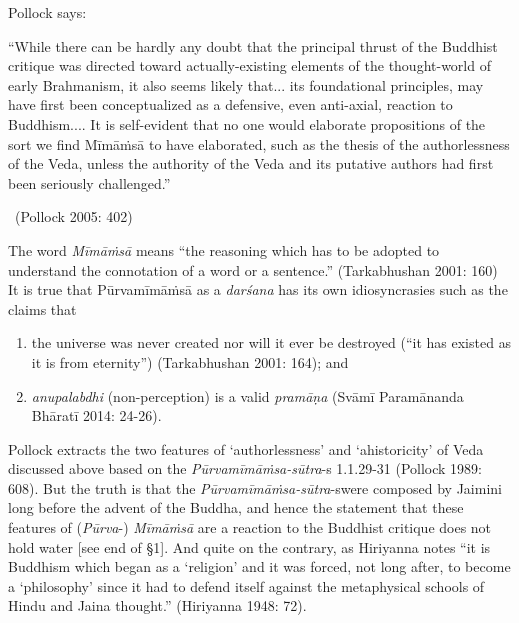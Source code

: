 Pollock says:

\begin{myquote}
“While there can be hardly any doubt that the principal thrust of the Buddhist critique was directed toward actually-existing elements of the thought-world of early Brahmanism, it also seems likely that... its foundational principles, may have first been conceptualized as a defensive, even anti-axial, reaction to Buddhism.... It is self-evident that no one would elaborate propositions of the sort we find Mīmāṁsā to have elaborated, such as the thesis of the authorlessness of the Veda, unless the authority of the Veda and its putative authors had first been seriously challenged.” 

~\hfill (Pollock 2005: 402)
\end{myquote}

The word \textit{Mīmāṁsā} means “the reasoning which has to be adopted to understand the connotation of a word or a sentence.” (Tarkabhushan 2001: 160) It is true that Pūrvamīmāṁsā as a \textit{darśana} has its own idiosyncrasies such as the claims that

\begin{enumerate}
\itemsep=0pt
\item the universe was never created nor will it ever be destroyed (“it has existed as it is from eternity”) (Tarkabhushan 2001: 164); and

 \item \textit{anupalabdhi} (non-perception) is a valid \textit{pramāṇa} (Svāmī Paramānanda Bhāratī 2014: 24-26).

\end{enumerate}

Pollock extracts the two features of ‘authorlessness’ and ‘ahistoricity’ of Veda discussed above based on the \textit{Pūrvamīmāṁsa-sūtra}-s 1.1.29-31 (Pollock 1989: 608). But the truth is that the \textit{Pūrvamīmāṁsa-sūtra}-s\break were composed by Jaimini long before the advent of the Buddha, and hence the statement that these features of (\textit{Pūrva}-) \textit{Mīmāṁsā }are a reaction to the Buddhist critique does not hold water [see end of §1]. And quite on the contrary, as Hiriyanna notes “it is Buddhism which began as a ‘religion’ and it was forced, not long after, to become a ‘philosophy’ since it had to defend itself against the metaphysical schools of Hindu and Jaina thought.” (Hiriyanna 1948: 72).

